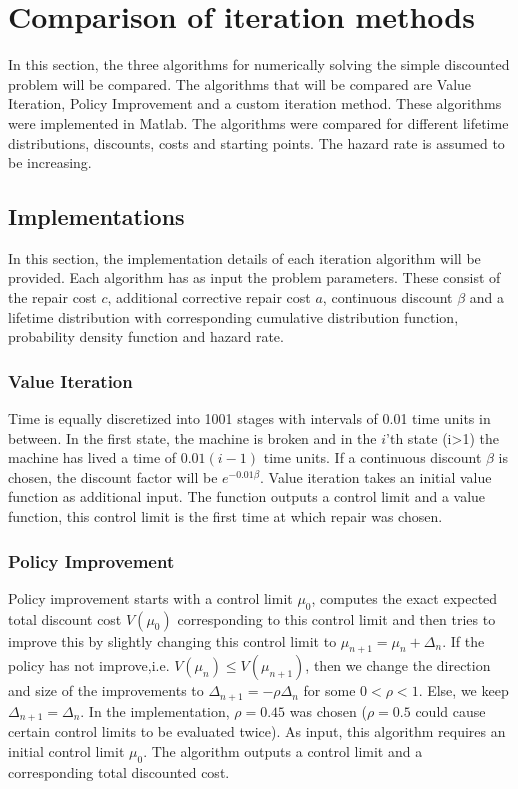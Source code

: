 


\chapter{Comparison of iteration methods}
In this section, the three algorithms for numerically solving the simple discounted problem will be compared.
The algorithms that will be compared are Value Iteration, Policy Improvement and a custom iteration method.
These algorithms were implemented in Matlab.
The algorithms were compared for different lifetime distributions, discounts, costs and starting points.
The hazard rate is assumed to be increasing.
\section{Implementations}
In this section, the implementation details of each iteration algorithm will be provided.
Each algorithm has as input the problem parameters.
These consist of the repair cost $c$, additional corrective repair cost $a$, continuous discount $\beta$ and a lifetime distribution with corresponding cumulative distribution function, probability density function and hazard rate.
\subsection{Value Iteration}
Time is equally discretized into 1001 stages with intervals of 0.01 time units in between.
In the first state, the machine is broken and in the $i$'th state (i>1) the machine has lived a time of $0.01(i-1)$ time units.
If a continuous discount $\beta$ is chosen, the discount factor will be $e^{-0.01\beta}$.
Value iteration takes an initial value function as additional input.
The function outputs a control limit and a value function, this control limit is the first time at which repair was chosen.

\subsection{Policy Improvement}
Policy improvement starts with a control limit $\mu_0$, computes the exact expected total discount cost $V(\mu_0)$ corresponding to this control limit and then tries to improve this by slightly changing this control limit to $\mu_{n+1}=\mu_n+\Delta_n$.
If the policy has not improve,i.e. $V(\mu_n)\leq V(\mu_{n+1})$, then we change the direction and size of the improvements to $\Delta_{n+1}=-\rho\Delta_n$ for some $0<\rho<1$.
Else, we keep $\Delta_{n+1}=\Delta_n$.
In the implementation, $\rho=0.45$ was chosen ($\rho=0.5$ could cause certain control limits to be evaluated twice).
As input, this algorithm requires an initial control limit $\mu_0$.
The algorithm outputs a control limit and a corresponding total discounted cost.

